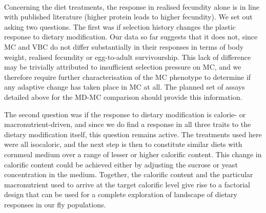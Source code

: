 \documentclass[12pt,onecolumn,twoside]{article}
\begin{document}
	\paragraph{\empty} Concerning the diet treatments, the response in realised fecundity alone is in line with published literature (higher protein leads to higher fecundity). We set out asking two questions. The first was if selection history changes the plastic response to dietary modification. Our data so far suggests that it does not, since MC and VBC do not differ substantially in their responses in terms of body weight, realised fecundity or egg-to-adult survivourship. This lack of difference may be trivially attributed to insufficient selection pressure on MC, and we therefore require further characterisation of the MC phenotype to determine if any adaptive change has taken place in MC at all. The planned set of assays detailed above for the MD-MC comparison should provide this information.

	The second question was if the response to dietary modification is calorie- or macronutrient-driven, and since we do find a response in all three traits to the dietary modification itself, this question remains active. The treatments used here were all isocaloric, and the next step is then to constitute similar diets with cornmeal medium over a range of lesser or higher calorific content. This change in calorific content could be achieved either by adjusting the sucrose or yeast concentration in the medium. Together, the calorific content and the particular macronutrient used to arrive at the target calorific level give rise to a factorial design that can be used for a complete exploration of landscape of dietary responses in our fly populations.
	
	
\end{document}
